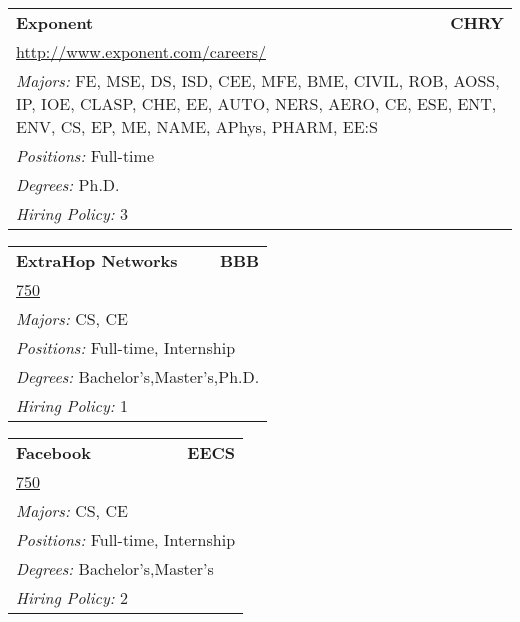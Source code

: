 \documentclass[twoside]{article}
\begin{document}
\begin{center}
\begin{multicols}{3}
\begin{FlushLeft}
\begin{minipage}{\columnwidth}
\end{minipage}
 
\begin{minipage}{\columnwidth}\begin{tabularx}{.95\columnwidth}{Xr}
                 {\Large\bf Exponent} & {\Large\bf CHRY}\\
    \multicolumn{2}{p{.95\columnwidth}}{\url{http://www.exponent.com/careers/}}\\
    \multicolumn{2}{p{.95\columnwidth}}{\emph{Majors:} FE, MSE, DS, ISD, CEE, MFE, BME, CIVIL, ROB, AOSS, IP, IOE, CLASP, CHE, EE, AUTO, NERS, AERO, CE, ESE, ENT, ENV, CS, EP, ME, NAME, APhys, PHARM, EE:S}\\
    \multicolumn{2}{p{.95\columnwidth}}{\emph{Positions:} Full-time}\\
    \multicolumn{2}{p{.95\columnwidth}}{\emph{Degrees:} Ph.D.}\\
    \multicolumn{2}{p{.95\columnwidth}}{\emph{Hiring Policy:} 3}\\
    \end{tabularx}
    
\end{minipage}
 
\begin{minipage}{\columnwidth}\begin{tabularx}{.95\columnwidth}{Xr}
                 {\Large\bf ExtraHop Networks} & {\Large\bf BBB}\\
    \multicolumn{2}{p{.95\columnwidth}}{\url{750}}\\
    \multicolumn{2}{p{.95\columnwidth}}{\emph{Majors:} CS, CE}\\
    \multicolumn{2}{p{.95\columnwidth}}{\emph{Positions:} Full-time, Internship}\\
    \multicolumn{2}{p{.95\columnwidth}}{\emph{Degrees:} Bachelor's,Master's,Ph.D.}\\
    \multicolumn{2}{p{.95\columnwidth}}{\emph{Hiring Policy:} 1}\\
    \end{tabularx}
    
\end{minipage}
 
\begin{minipage}{\columnwidth}\begin{tabularx}{.95\columnwidth}{Xr}
                 {\Large\bf Facebook} & {\Large\bf EECS}\\
    \multicolumn{2}{p{.95\columnwidth}}{\url{750}}\\
    \multicolumn{2}{p{.95\columnwidth}}{\emph{Majors:} CS, CE}\\
    \multicolumn{2}{p{.95\columnwidth}}{\emph{Positions:} Full-time, Internship}\\
    \multicolumn{2}{p{.95\columnwidth}}{\emph{Degrees:} Bachelor's,Master's}\\
    \multicolumn{2}{p{.95\columnwidth}}{\emph{Hiring Policy:} 2}\\
    \end{tabularx}
    

\end{minipage}
\end{FlushLeft}
\end{multicols}
\end{center}
\end{document}
